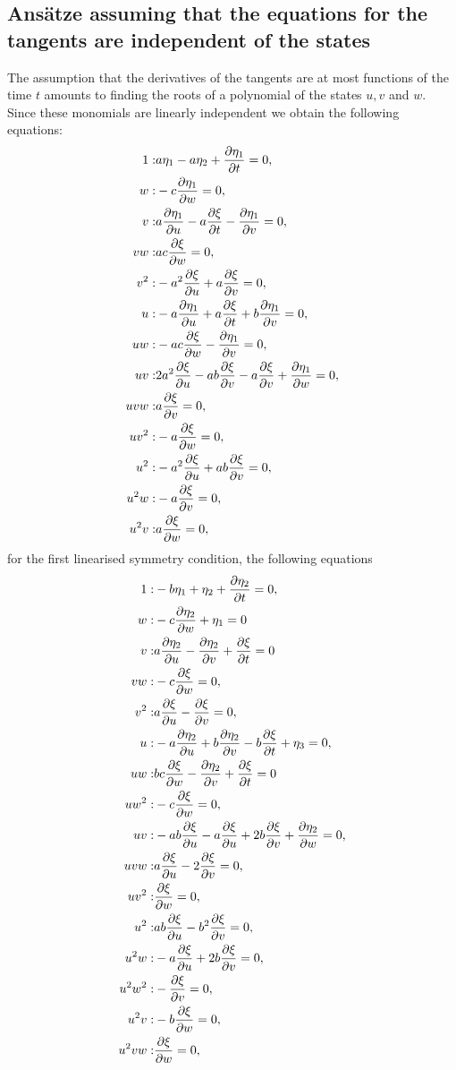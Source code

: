\subsection{Ans\"atze assuming that the equations for the tangents are independent of the states}
The assumption that the derivatives of the tangents are at most functions of the time $t$ amounts to finding the roots of a polynomial of the states $u,v$ and $w$. Since these monomials are linearly independent we obtain the following equations:
\begin{align}
1:&a \eta_1 - a \eta_2 + \pdv{\eta_1}{t}=0,\\
w:&- c \pdv{\eta_1}{w}=0,\\
v:&a \pdv{\eta_1}{u} - a \pdv{\xi}{t} - \pdv{\eta_1}{v}=0,\\
v w:&a c \pdv{\xi}{w}=0,\\
v^{2}:&- a^{2} \pdv{\xi}{u} + a \pdv{\xi}{v}=0,\\
u:&- a \pdv{\eta_1}{u} + a \pdv{\xi}{t} + b \pdv{\eta_1}{v}=0,\\
u w:&- a c \pdv{\xi}{w} - \pdv{\eta_1}{v}=0,\\
u v:&2 a^{2} \pdv{\xi}{u} - a b \pdv{\xi}{v} - a \pdv{\xi}{v} + \pdv{\eta_1}{w}=0,\\
u v w:&a \pdv{\xi}{v}=0,\\
u v^{2}:&- a \pdv{\xi}{w}=0,\\
u^{2}:&- a^{2} \pdv{\xi}{u} + a b \pdv{\xi}{v}=0,\\
u^{2} w:&- a \pdv{\xi}{v}=0,\\
u^{2} v:&a \pdv{\xi}{w}=0,
\end{align}
for the first linearised symmetry condition, the following equations
\begin{align}
1:&- b \eta_1 + \eta_2 + \pdv{\eta_2}{t}=0,\\
w:&- c \pdv{\eta_2}{w} + \eta_1=0\\
v:&a \pdv{\eta_2}{u} - \pdv{\eta_2}{v} + \pdv{\xi}{t}=0\\
v w:&- c \pdv{\xi}{w}=0,\\
v^{2}:&a \pdv{\xi}{u} - \pdv{\xi}{v}=0,\\
u:&- a \pdv{\eta_2}{u} + b \pdv{\eta_2}{v} - b \pdv{\xi}{t} + \eta_3=0,\\
u w:&b c \pdv{\xi}{w} - \pdv{\eta_2}{v} + \pdv{\xi}{t}=0\\
u w^{2}:&- c \pdv{\xi}{w}=0,\\
u v:&- a b \pdv{\xi}{u} - a \pdv{\xi}{u} + 2 b \pdv{\xi}{v} + \pdv{\eta_2}{w}=0,\\
u v w:&a \pdv{\xi}{u} - 2 \pdv{\xi}{v}=0,\\
u v^{2}:&\pdv{\xi}{w}=0,\\
u^{2}:&a b \pdv{\xi}{u} - b^{2} \pdv{\xi}{v}=0,\\
u^{2} w:&- a \pdv{\xi}{u} + 2 b \pdv{\xi}{v}=0,\\
u^{2} w^{2}:&- \pdv{\xi}{v}=0,\\
u^{2} v:&- b \pdv{\xi}{w}=0,\\
u^{2} v w:&\pdv{\xi}{w}=0,
\end{align}
